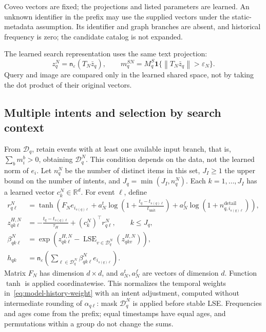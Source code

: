 \documentclass[12pt,a4paper]{article}
\newcommand{\R}{\mathbb R}
\newcommand{\ind}{\mathbf 1}
\newcommand{\eps}{\varepsilon}
\newcommand{\norm}[1]{\left\lVert#1\right\rVert}
\theoremstyle{plainru}
\begin{document}
Coveo vectors are fixed; the projections and listed parameters are learned.
An unknown identifier in the prefix may use the supplied
vectors under the static-metadata assumption. Its identifier
and graph branches are absent, and historical frequency is zero;
the candidate catalog is not expanded.

The learned search representation uses the same text projection:
\begin{equation}\label{eq:modern-query-vector}
z_q^N=\mathsf n_\eps(T_N\bar z_q),\qquad
m_q^{SN}=M_q^S\ind\{\norm{T_N\bar z_q}>\eps_N\}.
\end{equation}
Query and image are compared only in the learned shared space,
not by taking the dot product of their original vectors.

\subsection{Multiple intents and selection by search context}
\label{sec:modern-intents}

From $\mathcal D_q$, retain events with at least one available input
branch, that is, $\sum_bm_i^b>0$, obtaining $\mathcal D_q^N$.
This condition depends on the data, not the learned norm of $e_i$.
Let $n_q^N$ be the number of distinct
items in this set, $J_I\ge1$ the upper bound on the number of
intents, and $J_q=\min(J_I,n_q^N)$.
Each $k=1,\ldots,J_I$ has a learned vector
$c_k^N\in\R^d$. For event $\ell$, define
\begin{align}\label{eq:modern-history-transform}
r_{q\ell}^{N}&=\tanh\!\left(
F_Ne_{i_{s(q)\ell}}
+a_N^t\log\!\left(1+\frac{t_q-t_{s(q)\ell}}{t_{\mathrm{unit}}}\right)
+a_N^f\log(1+n_{q,i_{s(q)\ell}}^{\mathrm{detail}})
\right),\\
z_{qk\ell}^{H,N}
&=-\frac{t_q-t_{s(q)\ell}}{\tau_H}+(c_k^N)^\top r_{q\ell}^{N},
\qquad k\le J_q,\nonumber\\
\beta_{qk\ell}^{N}
&=\exp\!\left(z_{qk\ell}^{H,N}
-\operatorname{LSE}_{v\in\mathcal D_q^N}(z_{qkv}^{H,N})\right),
\nonumber\\
h_{qk}&=\mathsf n_\eps\!\left(
\sum_{\ell\in\mathcal D_q^N}\beta_{qk\ell}^{N}e_{i_{s(q)\ell}}
\right).
\nonumber
\end{align}
Matrix $F_N$ has dimension $d\times d$, and $a_N^t,a_N^f$ are
vectors of dimension $d$. Function $\tanh$ is applied coordinatewise.
This normalizes the temporal weights in~\eqref{eq:model-history-weight}
with an intent adjustment, computed without intermediate rounding of
$\alpha_{q\ell}$: mask $\mathcal D_q^N$ is applied before stable LSE.
Frequencies and ages come from the prefix; equal timestamps have
equal ages, and permutations within a group do not change the sums.
\end{document}

